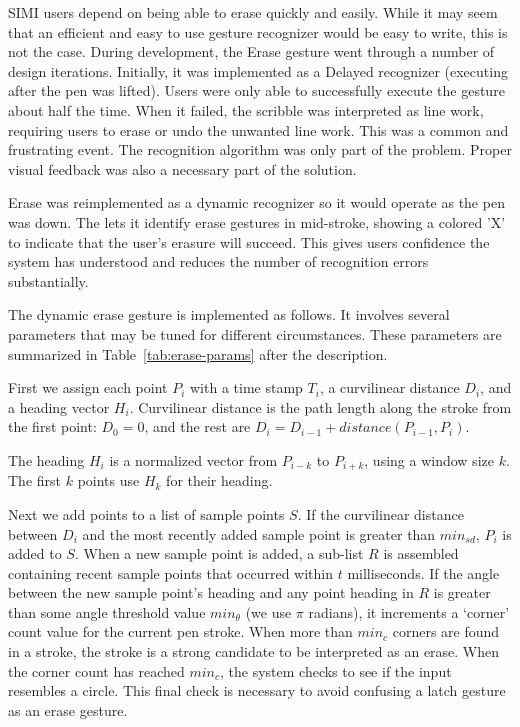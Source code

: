 


SIMI users depend on being able to erase quickly and easily. While it
may seem that an efficient and easy to use gesture recognizer would be
easy to write, this is not the case. During development, the Erase
gesture went through a number of design iterations. Initially, it was
implemented as a Delayed recognizer (executing after the pen was
lifted). Users were only able to successfully execute the gesture
about half the time. When it failed, the scribble was interpreted as
line work, requiring users to erase or undo the unwanted line work. This
was a common and frustrating event. The recognition algorithm was only
part of the problem. Proper visual feedback was also a necessary part
of the solution.

Erase was reimplemented as a dynamic recognizer so it would operate as
the pen was down. The lets it identify erase gestures in mid-stroke,
showing a colored 'X' to indicate that the user's erasure will
succeed. This gives users confidence the system has understood and
reduces the number of recognition errors substantially.

The dynamic erase gesture is implemented as follows. It involves
several parameters that may be tuned for different
circumstances. These parameters are summarized in
Table~\ref{tab:erase-params} after the description.

First we assign each point $P_i$ with a time stamp $T_i$, a
curvilinear distance $D_i$, and a heading vector $H_i$. Curvilinear
distance is the path length along the stroke from the first point:
$D_0=0$, and the rest are $D_i = D_{i-1} + distance(P_{i-1}, P_i)$.

The heading $H_i$ is a normalized vector from $P_{i-k}$ to $P_{i+k}$,
using a window size $k$. The first $k$ points use $H_k$ for their
heading.

Next we add points to a list of sample points $S$. If the curvilinear
distance between $D_i$ and the most recently added sample point is
greater than $min_{sd}$, $P_i$ is added to $S$. When a new sample
point is added, a sub-list $R$ is assembled containing recent sample
points that occurred within $t$ milliseconds. If the angle between the
new sample point's heading and any point heading in $R$ is greater
than some angle threshold value $min_\theta$ (we use $\pi$ radians),
it increments a `corner' count value for the current pen stroke. When
more than $min_c$ corners are found in a stroke, the stroke is a
strong candidate to be interpreted as an erase. When the corner count
has reached $min_c$, the system checks to see if the input resembles a
circle. This final check is necessary to avoid confusing a latch
gesture as an erase gesture. 

